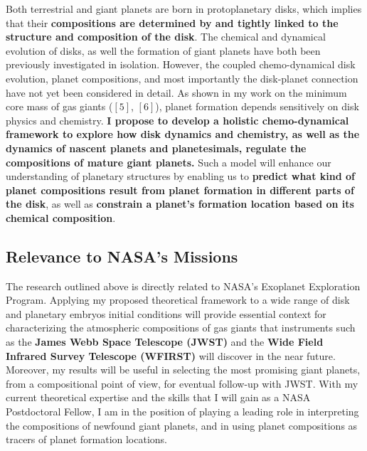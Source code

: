 \documentclass[12pt, letterpaper]{article}
\begin{document}
Both terrestrial and giant planets are born in protoplanetary disks, which implies that their \textbf{compositions are determined by and tightly linked to the structure and composition of the disk}. The chemical and dynamical evolution of disks, as well the formation of giant planets have both been previously investigated in isolation. However, the coupled chemo-dynamical disk evolution, planet compositions, and most importantly the disk-planet connection have not yet been considered in detail. As shown in my work on the minimum core mass of gas giants ($[5]$, $[6]$), planet formation depends sensitively on disk physics and chemistry. \textbf{I propose to develop a holistic chemo-dynamical framework to explore how disk dynamics and chemistry, as well as the dynamics of nascent planets and planetesimals, regulate the compositions of mature giant planets.} Such a model will enhance our understanding of planetary structures by enabling us to \textbf{predict what kind of planet compositions result from planet formation in different parts of the disk}, as well as \textbf{constrain a planet's formation location based on its chemical composition}. %

\subsection*{Relevance to NASA's Missions}

The research outlined above is directly related to NASA's Exoplanet Exploration Program. Applying my proposed theoretical framework to a wide range of disk and planetary embryos initial conditions will provide essential context for characterizing the atmospheric compositions of gas giants that instruments such as the \textbf{James Webb Space Telescope (JWST)} and the \textbf{Wide Field Infrared Survey Telescope (WFIRST)} will discover in the near future. Moreover, my results will be useful in selecting the most promising giant planets, from a compositional point of view, for eventual follow-up with JWST. With my current theoretical expertise and the skills that I will gain as a NASA Postdoctoral Fellow, I am in the position of playing a leading role in interpreting the compositions of newfound giant planets, and in using planet compositions as tracers of planet formation locations. 
\end{document}
